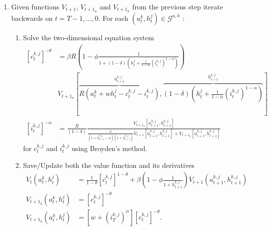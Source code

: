 \documentclass[a4paper,12pt]{article}%
\begin{document}
\begin{enumerate}
\item Given functions $V_{t+1}$, $V_{t+1_{a}}$ and $V_{t+1_{h}}$ from the previous step iterate backwards on $t=T-1,...,0$. For each $\left(  a_{t}^{k},h_{t}^{j}\right)  \in\mathcal{G}^{a,h}$ :

\begin{enumerate}
\item \label{EXGM interp}Solve the two-dimensional equation system
\begin{align*}
\left[ c_{t}^{k,j}\right]^{-\theta}  &  =\beta R\left( 1-\phi\frac{1}{1+\left( 1-\delta\right) \left(  h_{t}^{j}+\frac{1}{1-\alpha}\left(i_{t}^{k,j}\right)^{1-\alpha}\right)}\right) \\
&  \text{$V_{t+1_{a}}$}\left[\overset{a_{t+1}^{k,j}}{\overbrace{R\left(a_{t}^{k}+wh_{t}^{j}-c_{t}^{k,j}-i_{t}^{k,j}\right)  }},\overset{h_{t+1}^{k,j}}{\overbrace{\left(  1-\delta\right)  \left(  h_{t}^{j}+\frac{1}{1-\alpha}\left(  i_{t}^{k,j}\right)  ^{1-\alpha}\right)  }}\right] \\
\left[  i_{t}^{k,j}\right]^{-\alpha}  &  =\frac{R}{\left(  1-\delta\right)}\frac{\text{$V_{t+1_{a}}$}\left[  a_{t+1}^{k,j},h_{t+1}^{k,j}\right]}{\frac{\phi}{\left(  1+h_{t+1}^{k,j}-\phi\right)  \left(  1+h_{t+1}^{k,j}\right)  }V_{t+1}\left[  a_{t+1}^{k,j},h_{t+1}^{k,j}\right]+\text{$V_{t+1_{h}}$}\left[  a_{t+1}^{k,j},h_{t+1}^{k,j}\right]}
\end{align*}
for $c_{t}^{k,j}$ and $i_{t}^{k,j}$ using Broyden's method.

\item Save/Update both the value function and its derivatives
\begin{align*}
V_{t}\left(  a_{t}^{k},h_{t}^{j}\right)   &  =\frac{1}{1-\theta}\left[c_{t}^{k,j}\right]  ^{1-\theta}+\beta\left(  1-\phi\frac{1}{1+h_{t+1}^{k,j}}\right)  V_{t+1}(a_{t+1}^{k,j},h_{t+1}^{k,j})\\
\text{$V_{t+1_{a}}$}\left(  a_{t}^{k},h_{t}^{j}\right)   &  =\left[c_{t}^{k,j}\right]  ^{-\theta}\\
\text{$V_{t+1_{h}}$}\left(  a_{t}^{k},h_{t}^{j}\right)   &  =\left[  w+\left(  i_{T}^{k,j}\right)  ^{\alpha} \right]  \left[  c_{t}^{k,j}\right]^{-\theta}\text{.}
\end{align*}

\end{enumerate}
\end{enumerate}
\end{document}
